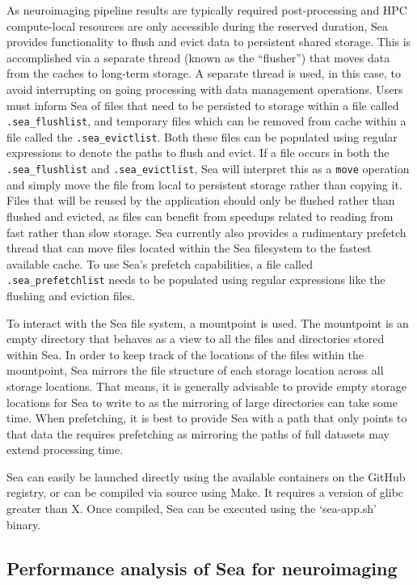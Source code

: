 \documentclass[10pt,journal,compsoc]{IEEEtran}
\begin{document}
As neuroimaging pipeline results are typically required post-processing and HPC compute-local resources are only accessible during the
reserved duration, Sea provides functionality to flush and evict data to persistent shared storage. This is accomplished via a separate
thread (known as the ``flusher'') that moves data from the caches to long-term storage. A separate thread is used, in this case, to avoid
interrupting on going processing with data management operations.
Users must inform Sea of files that need to be
persisted to storage within a file called \texttt{.sea\_flushlist}, and temporary files which can be removed from cache within a file
called the \texttt{.sea\_evictlist}. Both these files can be populated using regular expressions to denote the paths to flush and evict.
If a file occurs in both the \texttt{.sea\_flushlist} and \texttt{.sea\_evictlist}, Sea will interpret this as a \texttt{move} operation
and simply move the file from local to persistent storage rather than copying it. Files that will be reused by the application should only
be flushed rather than flushed and evicted, as files can benefit from speedups related to reading from fast rather than slow storage.
Sea currently also provides a rudimentary prefetch thread that can move files located within the Sea filesystem to the fastest available cache.
To use Sea's prefetch capabilities, a file called \texttt{.sea\_prefetchlist} needs to be populated using regular expressions like the
flushing and eviction files.

To interact with the Sea file system, a mountpoint is used. The mountpoint is an empty directory that behaves as a view to
all the files and directories stored within Sea. In order to keep track of the locations of the files within the mountpoint, Sea
mirrors the file structure of each storage location across all storage locations. That means, it is generally advisable to provide
empty storage locations for Sea to write to as the mirroring of large directories can take some time. When prefetching, it is
best to provide Sea with a path that only points to that data the requires prefetching as mirroring the paths of full datasets may 
extend processing time.

Sea can easily be launched directly using the available containers on the GitHub registry, or can be compiled via source using Make.
It requires a version of glibc greater than X. Once compiled, Sea can be executed using the `sea-app.sh' binary.

\subsection{Performance analysis of Sea for neuroimaging}
\end{document}
